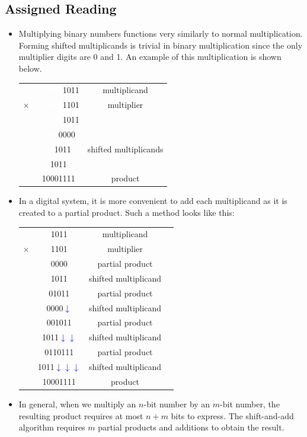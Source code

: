 \documentclass[10pt,a4paper]{article}
\begin{document}
\subsection{Assigned Reading}
\begin{itemize}
\item Multiplying binary numbers functions very similarly to normal multiplication. Forming shifted multiplicands is trivial in binary multiplication since the only multiplier digits are 0 and 1. An example of this multiplication is shown below.\\
\begin{tabular}{ccc}
  & \textcolor{white}{000000}1011 & multiplicand\\
$\times$ & \textcolor{white}{000000}1101 & multiplier\\
\cmidrule{1-2}
  & \textcolor{white}{000000}1011 & \\
  & \textcolor{white}{0000}0000 & \\
  & \textcolor{white}{00}1011 & shifted multiplicands\\
  & 1011 & \\
\cmidrule{1-2}
 & 10001111 & product 
\end{tabular}
\item In a digital system, it is more convenient to add each multiplicand as it is created to a partial product. Such a method looks like this:\\
\begin{tabular}{cccc}
  & 1011 & multiplicand\\
$\times$ & 1101 & multiplier\\
\cmidrule{1-2}
  & 0000 & partial product\\
  & 1011 & shifted multiplicand\\
\cmidrule{1-2}
  & 01011 & partial product\\
  & 0000\textcolor{blue}{$\downarrow$} & shifted multiplicand\\
\cmidrule{1-2}
  & 001011 & partial product\\
  & 1011\textcolor{blue}{$\downarrow\downarrow$} & shifted multiplicand\\
\cmidrule{1-2}
  & 0110111 & partial product\\
  & 1011\textcolor{blue}{$\downarrow\downarrow\downarrow$} & shifted multiplicand\\
\cmidrule{1-2}
  & 10001111 & product
\end{tabular}
\item In general, when we multiply an $n$-bit number by an $m$-bit number, the resulting product requires at most $n+m$ bits to express. The shift-and-add algorithm requires $m$ partial products and additions to obtain the result.

\end{itemize}
\end{document}
